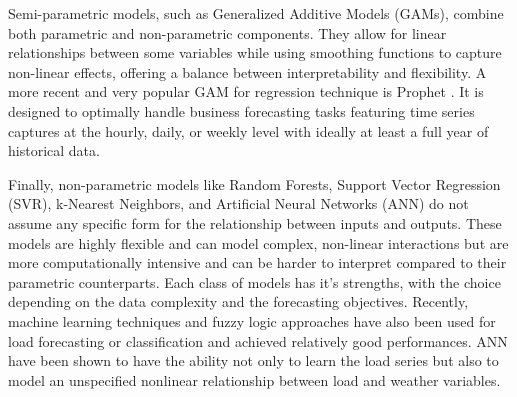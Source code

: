 \documentclass[mstat,12pt]{unswthesis}
\begin{document}
Semi-parametric models, such as Generalized Additive Models (GAMs),
combine both parametric and non-parametric components. They allow for
linear relationships between some variables while using smoothing
functions to capture non-linear effects, offering a balance between
interpretability and flexibility. A more recent and very popular GAM for
regression technique is Prophet \cite{taylor2017facebook}. It is
designed to optimally handle business forecasting tasks featuring time
series captures at the hourly, daily, or weekly level with ideally at
least a full year of historical data.

Finally, non-parametric models like Random Forests, Support Vector
Regression (SVR), k-Nearest Neighbors, and Artificial Neural Networks
(ANN) do not assume any specific form for the relationship between
inputs and outputs. These models are highly flexible and can model
complex, non-linear interactions but are more computationally intensive
and can be harder to interpret compared to their parametric
counterparts. Each class of models has it's strengths, with the choice
depending on the data complexity and the forecasting objectives.
Recently, machine learning techniques and fuzzy logic approaches have
also been used for load forecasting or classification and achieved
relatively good performances. ANN have been shown to have the ability
not only to learn the load series but also to model an unspecified
nonlinear relationship between load and weather variables.

\begin{table}[h]
  \caption{Forecasting methods}\label{tab:forecasting_methods1}
\end{table}
\end{document}
